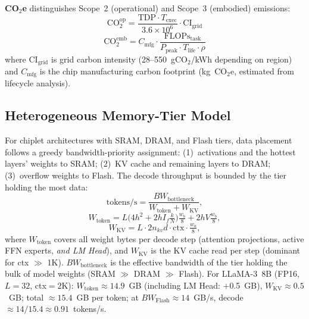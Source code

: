 \documentclass[journal]{IEEEtran}
\begin{document}
\textbf{CO$_2$e} distinguishes Scope~2 (operational) and Scope~3
(embodied) emissions:
\begin{equation}
  \text{CO}_2^{\text{op}} =
    \frac{\text{TDP}\cdot T_\text{exec}}{3.6\times10^6}\cdot\text{CI}_\text{grid}
  \label{eq:co2op}
\end{equation}
\begin{equation}
  \text{CO}_2^{\text{emb}} = C_\text{mfg}\cdot
    \frac{\text{FLOPs}_\text{task}}{P_\text{peak}\cdot T_\text{life}\cdot\rho}
  \label{eq:co2emb}
\end{equation}
where $\text{CI}_\text{grid}$ is grid carbon intensity (28--550~gCO$_2$/kWh
depending on region) and $C_\text{mfg}$ is the chip manufacturing carbon
footprint (kg~CO$_2$e, estimated from lifecycle analysis).

\subsection{Heterogeneous Memory-Tier Model}

For chiplet architectures with SRAM, DRAM, and Flash tiers, data placement
follows a greedy bandwidth-priority assignment:
(1)~activations and the hottest layers' weights to SRAM;
(2)~KV cache and remaining layers to DRAM;
(3)~overflow weights to Flash.
The decode throughput is bounded by the tier holding the most data:
\begin{equation}
  \text{tokens/s} = \frac{BW_\text{bottleneck}}{W_\text{token} + W_\text{KV}},
  \label{eq:hetero}
\end{equation}
\begin{equation}
  W_\text{token} = L\bigl(4h^2 + 2hI_f\tfrac{k}{N}\bigr)\tfrac{w_b}{8}
    + 2hV\tfrac{w_b}{8},
  \label{eq:wtoken}
\end{equation}
\begin{equation}
  W_\text{KV} = L\!\cdot\!2 n_{kv} d\!\cdot\!\text{ctx}\!\cdot\!\tfrac{w_a}{8},
  \label{eq:wkv}
\end{equation}
where $W_\text{token}$ covers all weight bytes per decode step (attention
projections, active FFN experts, \emph{and LM Head}), and $W_\text{KV}$
is the KV cache read per step (dominant for ctx $\gg$ 1K).
$BW_\text{bottleneck}$ is the effective bandwidth of the tier holding
the bulk of model weights (SRAM $\gg$ DRAM $\gg$ Flash).
For LLaMA-3~8B (FP16, $L{=}32$, ctx$=2$K):
$W_\text{token} \approx 14.9$~GB (including LM Head: $+$0.5~GB),
$W_\text{KV} \approx 0.5$~GB;
total $\approx15.4$~GB per token;
at $BW_\text{Flash}{\approx}14$~GB/s, decode
$\approx 14/15.4 \approx 0.91$~tokens/s.
\end{document}
